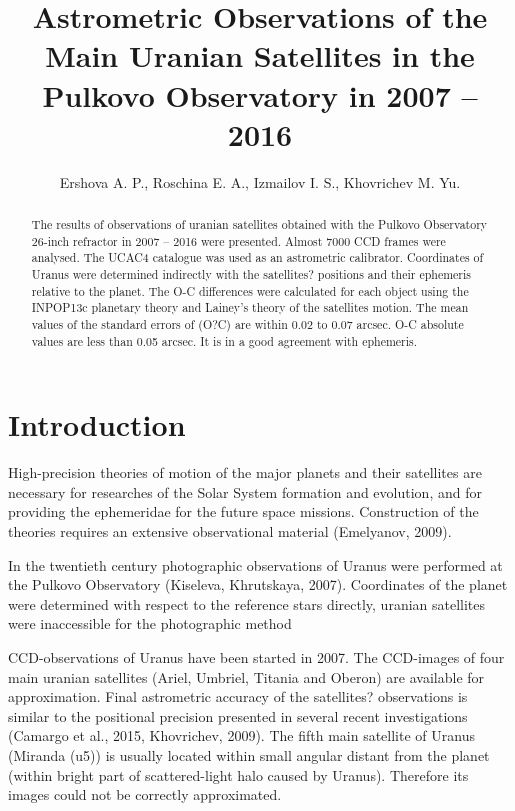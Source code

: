 \documentclass[]{article}
\title{Astrometric Observations of the Main Uranian Satellites in the Pulkovo Observatory in 2007 -- 2016}
\author{Ershova A. P., Roschina E. A., Izmailov I. S., Khovrichev M. Yu.}
\begin{document}
\maketitle

\begin{abstract}
The results of observations of uranian satellites obtained with the Pulkovo Observatory 26-inch refractor in 2007 -- 2016 were presented. Almost 7000 CCD frames were analysed. The UCAC4 catalogue was used as an astrometric calibrator. Coordinates of Uranus were determined indirectly with the satellites? positions and their ephemeris relative to the planet. The O-C differences were calculated for each object using the INPOP13c planetary theory and Lainey's theory of the satellites motion. The mean values of the standard errors of (O?C) are within $0.02$ to $0.07$ arcsec. O-C absolute values are less than 0.05 arcsec. It is in a good agreement with ephemeris.
\end{abstract}

\section{Introduction}
High-precision theories of motion of the major planets and their satellites are necessary for researches of the Solar System formation and evolution, and for providing the ephemeridae for the future space missions. Construction of the theories requires an extensive observational material (Emelyanov, 2009).\par

In the twentieth century photographic observations of Uranus were performed at the Pulkovo Observatory (Kiseleva, Khrutskaya, 2007). Coordinates of the planet were determined with respect to the reference stars directly, uranian satellites were inaccessible for the photographic method\par

CCD-observations of Uranus have been started in 2007. The CCD-images of four main uranian satellites (Ariel, Umbriel, Titania and Oberon) are available for approximation. Final astrometric accuracy of the satellites? observations is similar to the positional precision presented in several recent investigations (Camargo et al., 2015, Khovrichev, 2009).  The fifth main satellite of Uranus (Miranda (u5)) is usually located within small angular distant from the planet (within bright part of scattered-light halo caused by Uranus). Therefore its images could not be correctly approximated.\par
\end{document}

